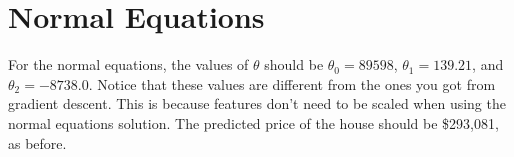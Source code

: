 \documentclass[10pt,a4paper]{article}
\begin{document}
\section{Normal Equations}
%
  For the normal equations, the values of $\theta$ should be $\theta_0 = 89598$, $\theta_1=139.21$, and $\theta_2=-8738.0$. Notice that these values are different from the ones you got from gradient descent. This is because features don't need to be scaled when using the normal equations solution. The predicted price of the house should be \$293,081, as before.
  
\end{document}
